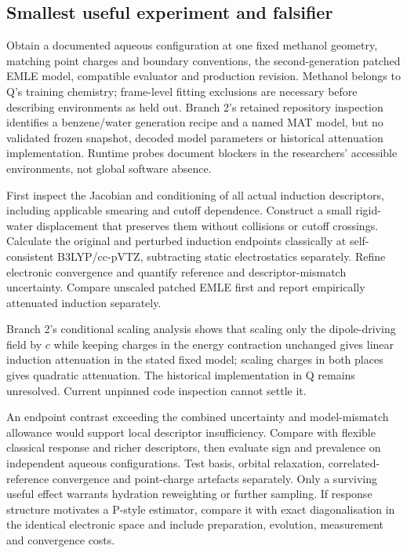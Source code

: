 \documentclass{article}
\begin{document}
\subsection{Smallest useful experiment and falsifier}

Obtain a documented aqueous configuration at one fixed methanol geometry, matching point charges and boundary conventions, the second-generation patched EMLE model, compatible evaluator and production revision. Methanol belongs to Q's training chemistry; frame-level fitting exclusions are necessary before describing environments as held out. Branch 2's retained repository inspection identifies a benzene/water generation recipe and a named MAT model, but no validated frozen snapshot, decoded model parameters or historical attenuation implementation. Runtime probes document blockers in the researchers' accessible environments, not global software absence.

First inspect the Jacobian and conditioning of all actual induction descriptors, including applicable smearing and cutoff dependence. Construct a small rigid-water displacement that preserves them without collisions or cutoff crossings. Calculate the original and perturbed induction endpoints classically at self-consistent B3LYP/cc-pVTZ, subtracting static electrostatics separately. Refine electronic convergence and quantify reference and descriptor-mismatch uncertainty. Compare unscaled patched EMLE first and report empirically attenuated induction separately.

Branch 2's conditional scaling analysis shows that scaling only the dipole-driving field by $c$ while keeping charges in the energy contraction unchanged gives linear induction attenuation in the stated fixed model; scaling charges in both places gives quadratic attenuation. The historical implementation in Q remains unresolved. Current unpinned code inspection cannot settle it.

An endpoint contrast exceeding the combined uncertainty and model-mismatch allowance would support local descriptor insufficiency. Compare with flexible classical response and richer descriptors, then evaluate sign and prevalence on independent aqueous configurations. Test basis, orbital relaxation, correlated-reference convergence and point-charge artefacts separately. Only a surviving useful effect warrants hydration reweighting or further sampling. If response structure motivates a P-style estimator, compare it with exact diagonalisation in the identical electronic space and include preparation, evolution, measurement and convergence costs.
\end{document}
